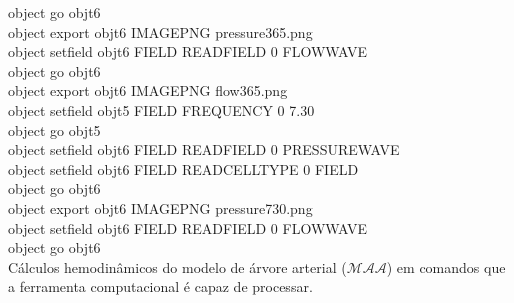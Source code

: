 \documentclass[a4paper,12pt]{monografia}
\theoremstyle{plain}
\theoremstyle{definition}
\theoremstyle{remark}
\begin{document}
\begin{appendices}
\begin{algorithm}[H]
		object go obj\underline{\space\space}t6 \\
		object export obj\underline{\space\space}t6 IMAGE\underline{\space\space}PNG pressure\underline{\space\space}3\underline{\space\space}65.png \\
		object set\underline{\space\space}field obj\underline{\space\space}t6 FIELD READ\underline{\space\space}FIELD 0 FLOW\underline{\space\space}WAVE \\
		object go obj\underline{\space\space}t6 \\
		object export obj\underline{\space\space}t6 IMAGE\underline{\space\space}PNG flow\underline{\space\space}3\underline{\space\space}65.png \\
		object set\underline{\space\space}field obj\underline{\space\space}t5 FIELD FREQUENCY 0 7.30 \\
		object go obj\underline{\space\space}t5 \\
		object set\underline{\space\space}field obj\underline{\space\space}t6 FIELD READ\underline{\space\space}FIELD 0 PRESSURE\underline{\space\space}WAVE \\
		object set\underline{\space\space}field obj\underline{\space\space}t6 FIELD READ\underline{\space\space}CELL\underline{\space\space}TYPE 0 FIELD \\
		object go obj\underline{\space\space}t6 \\
		object export obj\underline{\space\space}t6 IMAGE\underline{\space\space}PNG pressure\underline{\space\space}7\underline{\space\space}30.png \\
		object set\underline{\space\space}field obj\underline{\space\space}t6 FIELD READ\underline{\space\space}FIELD 0 FLOW\underline{\space\space}WAVE \\
		object go obj\underline{\space\space}t6 \\

	\caption{Cálculos hemodinâmicos do modelo de árvore arterial ($\mathcal{MAA}$) em comandos que a ferramenta computacional é capaz de processar.}
\end{algorithm}


\end{appendices}
\end{document}
